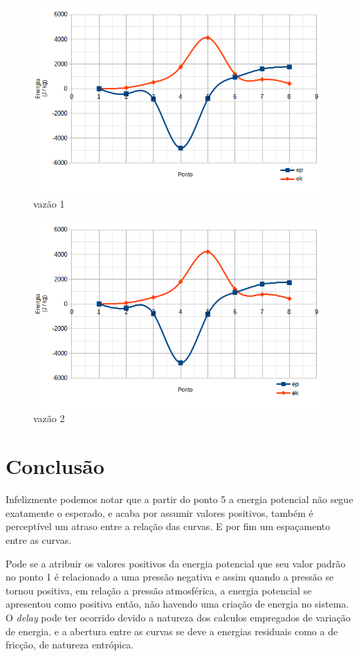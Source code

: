 \documentclass[12pt, a4]{article}
\begin{document}
\begin{figure}[H]
    \caption{vazão 1}
    \includegraphics[scale = 0.60]{vent1.png}
\end{figure}

\begin{figure}[H]
    \caption{vazão 2}
    \includegraphics[scale = 0.60]{vent2.png}
\end{figure}



\section{Conclusão}

\tab Infelizmente podemos notar que a partir do ponto 5 a energia potencial não segue exatamente
o esperado, e acaba por assumir valores positivos, também é perceptível um atraso entre a relação das curvas.
E por fim um espaçamento entre as curvas.

Pode se a atribuir os valores positivos da energia potencial que seu valor padrão no ponto 1 é relacionado a uma
pressão negativa e assim quando a pressão se tornou positiva, em relação a pressão atmosférica, a energia potencial
se apresentou como positiva então, não havendo uma criação de energia no sistema. O \emph{delay} pode ter ocorrido
devido a natureza dos calculos empregados de variação de energia. e a abertura entre as curvas se deve a energias 
residuais como a de fricção, de natureza entrópica.
\end{document}
